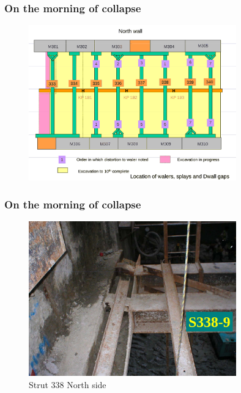 \documentclass[notes]{beamer}
\begin{document}
\begin{frame}
\frametitle{On the morning of collapse}
\begin{figure}[ht]
	\centering
	\includegraphics[width=0.8\textwidth]{figs/splays-dwall-gaps.png}
\end{figure}
\end{frame}

\begin{frame}
\frametitle{On the morning of collapse}
\begin{figure}[ht]
	\centering
	\includegraphics[width=0.8\textwidth]{figs/strut-338.png}
	\caption*{Strut 338 North side}
\end{figure}
\end{frame}
\end{document}
